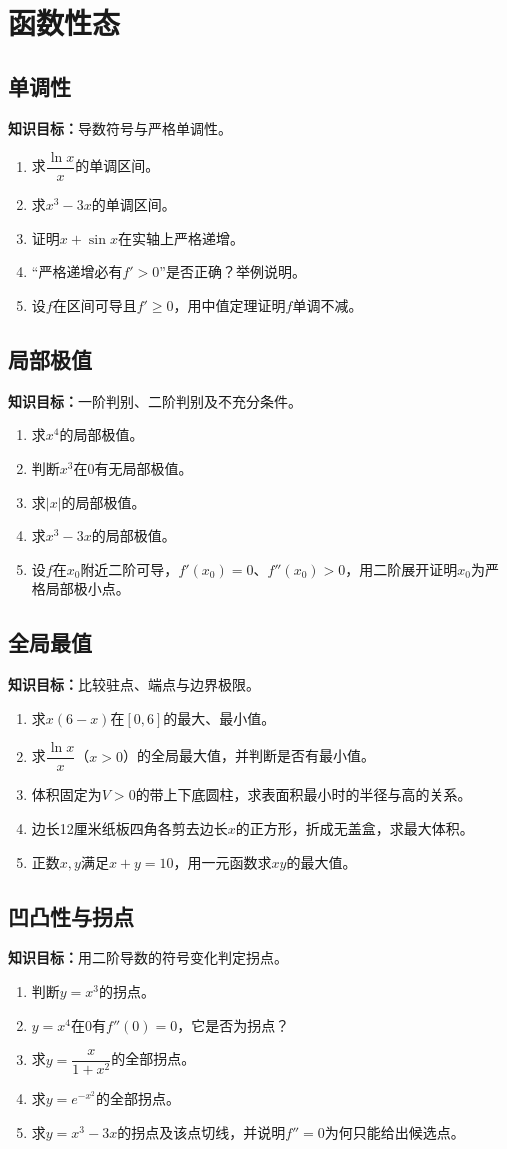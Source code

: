 \documentclass[11pt,a4paper,fontset=fandol]{ctexrep}
\newcommand{\goal}[1]{\textbf{知识目标：}#1\par}
\begin{document}
\section{函数性态}
\subsection{单调性}
\goal{导数符号与严格单调性。}
\begin{enumerate}
\item 求$\dfrac{\ln x}{x}$的单调区间。
\item 求$x^3-3x$的单调区间。
\item 证明$x+\sin x$在实轴上严格递增。
\item “严格递增必有$f'>0$”是否正确？举例说明。
\item 设$f$在区间可导且$f'\ge0$，用中值定理证明$f$单调不减。
\end{enumerate}
\subsection{局部极值}
\goal{一阶判别、二阶判别及不充分条件。}
\begin{enumerate}
\item 求$x^4$的局部极值。
\item 判断$x^3$在0有无局部极值。
\item 求$|x|$的局部极值。
\item 求$x^3-3x$的局部极值。
\item 设$f$在$x_0$附近二阶可导，$f'(x_0)=0$、$f''(x_0)>0$，用二阶展开证明$x_0$为严格局部极小点。
\end{enumerate}
\subsection{全局最值}
\goal{比较驻点、端点与边界极限。}
\begin{enumerate}
\item 求$x(6-x)$在$[0,6]$的最大、最小值。
\item 求$\dfrac{\ln x}{x}$（$x>0$）的全局最大值，并判断是否有最小值。
\item 体积固定为$V>0$的带上下底圆柱，求表面积最小时的半径与高的关系。
\item 边长12厘米纸板四角各剪去边长$x$的正方形，折成无盖盒，求最大体积。
\item 正数$x,y$满足$x+y=10$，用一元函数求$xy$的最大值。
\end{enumerate}
\subsection{凹凸性与拐点}
\goal{用二阶导数的符号变化判定拐点。}
\begin{enumerate}
\item 判断$y=x^3$的拐点。
\item $y=x^4$在0有$f''(0)=0$，它是否为拐点？
\item 求$y=\dfrac{x}{1+x^2}$的全部拐点。
\item 求$y=e^{-x^2}$的全部拐点。
\item 求$y=x^3-3x$的拐点及该点切线，并说明$f''=0$为何只能给出候选点。
\end{enumerate}
\end{document}

